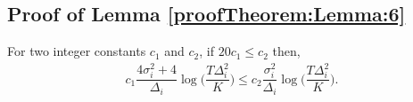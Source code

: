 %

%
% 
%



\subsection{Proof of Lemma \ref{proofTheorem:Lemma:6}}
\label{App:Lemma:6}
\begin{customlem}{6}
For two integer constants $c_1$ and $c_2$, if $20 c_1 \leq c_2$ then,
\begin{align*}
c_1 \dfrac{4\sigma_i^2 + 4}{\Delta_i}\log\bigg( \dfrac{T\Delta_i^2}{K}\bigg) \leq c_2 \dfrac{\sigma_i^2}{\Delta_i}\log\bigg( \dfrac{T\Delta_i^2}{K}\bigg).
\end{align*}
 
\end{customlem}

